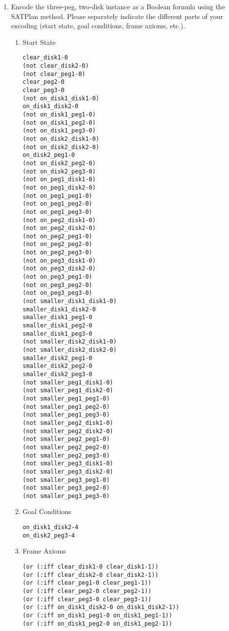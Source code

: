 \documentclass[12pt,letterpaper]{ntdhw}
\begin{document}
\begin{enumerate}
    \item  Encode the three-peg, two-disk instance as a Boolean formula using the
    SATPlan method.  Please separately indicate the different parts of your
    encoding (start state, goal conditions, frame axioms, etc.).
    \begin{enumerate}
        \item Start State
        \begin{lstlisting}[language=pddl, style=pddlstyle,
  basicstyle=\scriptsize]
clear_disk1-0
(not clear_disk2-0)
(not clear_peg1-0)
clear_peg2-0
clear_peg3-0
(not on_disk1_disk1-0)
on_disk1_disk2-0
(not on_disk1_peg1-0)
(not on_disk1_peg2-0)
(not on_disk1_peg3-0)
(not on_disk2_disk1-0)
(not on_disk2_disk2-0)
on_disk2_peg1-0
(not on_disk2_peg2-0)
(not on_disk2_peg3-0)
(not on_peg1_disk1-0)
(not on_peg1_disk2-0)
(not on_peg1_peg1-0)
(not on_peg1_peg2-0)
(not on_peg1_peg3-0)
(not on_peg2_disk1-0)
(not on_peg2_disk2-0)
(not on_peg2_peg1-0)
(not on_peg2_peg2-0)
(not on_peg2_peg3-0)
(not on_peg3_disk1-0)
(not on_peg3_disk2-0)
(not on_peg3_peg1-0)
(not on_peg3_peg2-0)
(not on_peg3_peg3-0)
(not smaller_disk1_disk1-0)
smaller_disk1_disk2-0
smaller_disk1_peg1-0
smaller_disk1_peg2-0
smaller_disk1_peg3-0
(not smaller_disk2_disk1-0)
(not smaller_disk2_disk2-0)
smaller_disk2_peg1-0
smaller_disk2_peg2-0
smaller_disk2_peg3-0
(not smaller_peg1_disk1-0)
(not smaller_peg1_disk2-0)
(not smaller_peg1_peg1-0)
(not smaller_peg1_peg2-0)
(not smaller_peg1_peg3-0)
(not smaller_peg2_disk1-0)
(not smaller_peg2_disk2-0)
(not smaller_peg2_peg1-0)
(not smaller_peg2_peg2-0)
(not smaller_peg2_peg3-0)
(not smaller_peg3_disk1-0)
(not smaller_peg3_disk2-0)
(not smaller_peg3_peg1-0)
(not smaller_peg3_peg2-0)
(not smaller_peg3_peg3-0)
        \end{lstlisting}
        \item Goal Conditions
        \begin{lstlisting}[language=pddl, style=pddlstyle,
  basicstyle=\scriptsize]
on_disk1_disk2-4
on_disk2_peg3-4
        \end{lstlisting}
        \item Frame Axioms
        \begin{lstlisting}[language=pddl, style=pddlstyle,
  basicstyle=\scriptsize]
(or (:iff clear_disk1-0 clear_disk1-1))
(or (:iff clear_disk2-0 clear_disk2-1))
(or (:iff clear_peg1-0 clear_peg1-1))
(or (:iff clear_peg2-0 clear_peg2-1))
(or (:iff clear_peg3-0 clear_peg3-1))
(or (:iff on_disk1_disk2-0 on_disk1_disk2-1))
(or (:iff on_disk1_peg1-0 on_disk1_peg1-1))
(or (:iff on_disk1_peg2-0 on_disk1_peg2-1))

\end{lstlisting}
\end{enumerate}
\end{enumerate}
\end{document}
